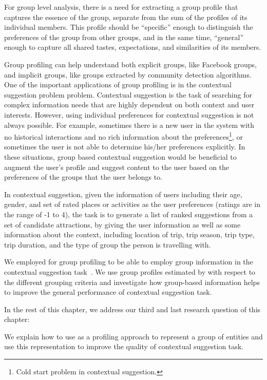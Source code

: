 For group level analysis, there is a need for extracting a group profile that captures the essence of the group, separate from the sum of the profiles of its individual members. This profile should be ``specific'' enough to distinguish the preferences of the group from other groups, and in the same time, ``general'' enough to capture all shared tastes, expectations, and similarities of its members. 

Group profiling can help understand both explicit groups, like Facebook groups, and implicit groups, like groups extracted by community detection algorithms. One of the important applications of group profiling is in the contextual suggestion problem problem.  
Contextual suggestion is the task of searching for complex information needs that are highly dependent on both context and user interests. However, using individual preferences for contextual suggestion is not always possible. 
For example, sometimes there is a new user in the system with no historical interactions and no rich information about the preferences\footnote{Cold start problem in contextual suggestion.}, or sometimes the user is not able to determine his/her preferences explicitly. In these situations, group based contextual suggestion would be beneficial to augment the user's profile and suggest content to the user based on the preferences of the groups that the user belongs to. 

In contextual suggestion, given the information of users including their age, gender, and set of rated places or activities as the user preferences (ratings are in the range of -1 to 4), the task is to generate a list of ranked suggestions from a set of candidate attractions, by giving the user information as well as some information about the context, including location of trip, trip season, trip type, trip duration, and the type of group the person is travelling with.

We employed \acswlm for group profiling to be able to employ group information in the contextual suggestion task~\citep{Dehghani2016:trec,Dehghani:2016:CHIIR,Hashemi:2015}. We use group profiles estimated by \acswlm with respect to the different grouping criteria and investigate how group-based information helps to improve the general performance of contextual suggestion task. 

In the rest of this chapter, we address our third and last research question of this chapter: 
\begin{resqbox}
\emph{}
\end{resqbox}
We explain how to use \acswlm as a profiling approach to represent a group of entities and use this representation to improve the quality of contextual suggestion task.

